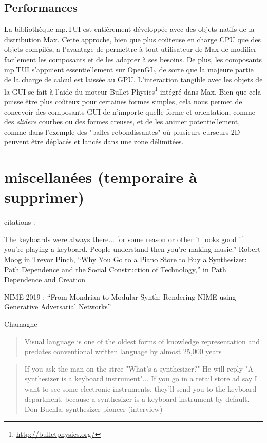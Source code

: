 \subsection{Performances}
La bibliothèque mp.TUI est entièrement développée avec des objets natifs de la distribution Max. Cette approche, bien que plus coûteuse en charge \gls{CPU} que des objets compilés, a l'avantage de permettre à tout utilisateur de Max de modifier facilement les composants et de les adapter à ses besoins. De plus, les composants mp.TUI s'appuient essentiellement sur OpenGL, de sorte que la majeure partie de la charge de calcul est laissée au \gls{GPU}. L'interaction tangible avec les objets de la \gls{GUI} se fait à l'aide du moteur Bullet-Physics\footnote{\url{http://bulletphysics.org/}} intégré dans Max. Bien que cela puisse être plus coûteux pour certaines formes simples, cela nous permet de concevoir des composants \gls{GUI} de n'importe quelle forme et orientation, comme des \textit{sliders} courbes ou des formes creuses, et de les animer potentiellement, comme dans l'exemple des "balles rebondissantes" où plusieurs curseurs 2D peuvent être déplacés et lancés dans une zone délimitées.

\section*{miscellanées (temporaire à supprimer)}
citations :

The  keyboards  were  always  there...  for  some  reason  or  other  it  looks  good  if  you’re playing a keyboard. People understand then you’re making music.” Robert Moog in Trevor Pinch, “Why You Go to a Piano Store to Buy a Synthesizer: Path Dependence and the Social Construction of Technology,” in Path Dependence and Creation


NIME 2019 : ``From Mondrian to Modular Synth: Rendering NIME using Generative Adversarial Networks''

Chamagne

\begin{quote}
Visual language is one of the oldest forms of knowledge representation and predates conventional written language by almost 25,000 years
\end{quote}
\cite{tufte_visual_2001}

\cite{moody_physics_2009}


\begin{quotation}
If you ask the man on the stree "What's a synthesizer?" He will reply "A synthesizer is a keyboard instrument"... If you go in a retail store ad say I want to see some electronic instruments, they'll send you to the keyboard department, because a synthesizer is a keyboard instrument by default. — Don Buchla, synthesizer pioneer (interview)
\end{quotation}
\cite{pinch_why_2001}